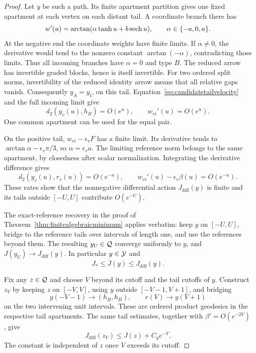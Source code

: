 \begin{proof}
Let $y$ be such a path. Its finite apartment partition gives
one fixed apartment at each vertex on each distant tail.
A coordinate branch there has
\begin{equation}\label{eq:candidatetailvelocity}
 w'(u)=\arctan(\alpha\tanh u+b\operatorname{sech} u),
 \qquad \alpha\in\{-a,0,a\}.
\end{equation}
At the negative end the coordinate weights have finite limits.
If $\alpha\ne0$, the derivative would tend to the nonzero
constant $\arctan(-\alpha)$, contradicting those limits.
Thus all incoming branches have $\alpha=0$ and type $B$.
The reduced arrow has invertible graded blocks, hence is
itself invertible. For two ordered split norms, invertibility
of the reduced identity arrow means that all relative gaps
vanish. Consequently $y_A=y_C$ on this tail.
Equation~\eqref{eq:candidatetailvelocity} and the full incoming
limit give
\[
 d_2(y_v(u),h_B)=O(e^u),\qquad w_{vi}'(u)=O(e^u).
\]
One common apartment can be used for the equal pair.

On the positive tail, $w_{vi}-\epsilon_vF$ has a finite limit.
Its derivative tends to $\arctan\alpha-\epsilon_v\pi/3$,
so $\alpha=\epsilon_va$. The limiting reference norm belongs
to the same apartment, by closedness after scalar normalization.
Integrating the derivative difference gives
\[
 d_2(y_v(u),r_v(u))=O(e^{-u}),\qquad
 w_{vi}'(u)-\epsilon_v\beta(u)=O(e^{-u}).
\]
These rates show that the nonnegative differential action
$J_{\mathrm{diff}}(y)$ is finite and its tails outside
$[-U,U]$ contribute $O(e^{-U})$.

The exact-reference recovery in the proof of
Theorem~\ref{thm:finitealgebraicminimum} applies verbatim:
keep $y$ on $[-U,U]$, bridge to the reference tails over
intervals of length one, and use the references beyond them.
The resulting $y_U\in\mathcal Q$ converge uniformly to $y$, and
$J(y_U)\to J_{\mathrm{diff}}(y)$. In particular $y\in\mathcal Y$
and
\begin{equation}\label{eq:candidaterecovery}
 J_*\le\overline J(y)\le J_{\mathrm{diff}}(y).
\end{equation}

Fix any $z\in\mathcal Q$ and choose $V$ beyond its cutoff and the
tail cutoffs of $y$. Construct $z_V$ by keeping $z$ on
$[-V,V]$, using $y$ outside $[-V-1,V+1]$, and bridging
\[
 y(-V-1)\longrightarrow(h_B,h_B),\qquad
 r(V)\longrightarrow y(V+1)
\]
on the two intervening unit intervals. These are ordered
product geodesics in the respective tail apartments.
The same tail estimates, together with $\beta'=O(e^{-2V})$,
give
\begin{equation}\label{eq:competitortailcost}
 J_{\mathrm{diff}}(z_V)\le J(z)+C_y e^{-V}.
\end{equation}
The constant is independent of $z$ once $V$ exceeds its cutoff.


\end{proof}
